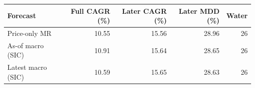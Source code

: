 \begin{tabular}{@{}lrrrr@{}}\toprule
Forecast & Full CAGR (\%) & Later CAGR (\%) & Later MDD (\%) & Water\\\midrule
Price-only MR & 10.55 & 15.56 & 28.96 & 26\\
As-of macro (SIC) & 10.91 & 15.64 & 28.65 & 26\\
Latest macro (SIC) & 10.59 & 15.65 & 28.63 & 26\\
\bottomrule
\end{tabular}
